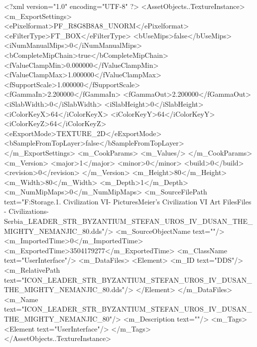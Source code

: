 <?xml version="1.0" encoding="UTF-8" ?>
<AssetObjects..TextureInstance>
	<m_ExportSettings>
		<ePixelformat>PF_R8G8B8A8_UNORM</ePixelformat>
		<eFilterType>FT_BOX</eFilterType>
		<bUseMips>false</bUseMips>
		<iNumManualMips>0</iNumManualMips>
		<bCompleteMipChain>true</bCompleteMipChain>
		<fValueClampMin>0.000000</fValueClampMin>
		<fValueClampMax>1.000000</fValueClampMax>
		<fSupportScale>1.000000</fSupportScale>
		<fGammaIn>2.200000</fGammaIn>
		<fGammaOut>2.200000</fGammaOut>
		<iSlabWidth>0</iSlabWidth>
		<iSlabHeight>0</iSlabHeight>
		<iColorKeyX>64</iColorKeyX>
		<iColorKeyY>64</iColorKeyY>
		<iColorKeyZ>64</iColorKeyZ>
		<eExportMode>TEXTURE_2D</eExportMode>
		<bSampleFromTopLayer>false</bSampleFromTopLayer>
	</m_ExportSettings>
	<m_CookParams>
		<m_Values/>
	</m_CookParams>
	<m_Version>
		<major>1</major>
		<minor>0</minor>
		<build>0</build>
		<revision>0</revision>
	</m_Version>
	<m_Height>80</m_Height>
	<m_Width>80</m_Width>
	<m_Depth>1</m_Depth>
	<m_NumMipMaps>0</m_NumMipMaps>
	<m_SourceFilePath text="F:\Mod Storage\2.1. Civilization VI\Mods\Archive - Pictures\Sid Meier's Civilization VI Art Files\Art Files - Civilizations\Civilization - Serbia\ICON_LEADER_STR_BYZANTIUM_STEFAN_UROS_IV_DUSAN_THE_MIGHTY_NEMANJIC_80.dds"/>
	<m_SourceObjectName text=""/>
	<m_ImportedTime>0</m_ImportedTime>
	<m_ExportedTime>3504179277</m_ExportedTime>
	<m_ClassName text="UserInterface"/>
	<m_DataFiles>
		<Element>
			<m_ID text="DDS"/>
			<m_RelativePath text="ICON_LEADER_STR_BYZANTIUM_STEFAN_UROS_IV_DUSAN_THE_MIGHTY_NEMANJIC_80.dds"/>
		</Element>
	</m_DataFiles>
	<m_Name text="ICON_LEADER_STR_BYZANTIUM_STEFAN_UROS_IV_DUSAN_THE_MIGHTY_NEMANJIC_80"/>
	<m_Description text=""/>
	<m_Tags>
		<Element text="UserInterface"/>
	</m_Tags>
</AssetObjects..TextureInstance>

